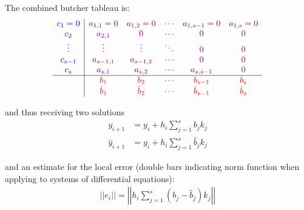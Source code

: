 The combined butcher tableau is:
\begin{align*}
    \begin{array}{c|ccccc}
    {\color{blue}c_1 = 0}
        & {\color{purple}a_{1,1} = 0}
        & {\color{purple}a_{1,2} = 0}
        & {\color{purple}\cdots}
        & {\color{purple}a_{1,{s-1}} = 0}
        & {\color{purple}a_{1,s} = 0}
        \\
        {\color{blue}c_2}
        & {\color{purple}a_{2,1}}
        & {\color{purple}0}
        & {\color{purple}\cdots}
        & {\color{purple}0}
        & {\color{purple}0}
        \\
        {\color{blue}\vdots}
        & {\color{purple}\vdots}
        & {\color{purple}\vdots}
        & {\color{purple}\ddots}
        & {\color{purple}0}
        & {\color{purple}0}
        \\
        {\color{blue}c_{s-1}}
        & {\color{purple}a_{s-1,1}}
        & {\color{purple}a_{s-1,2}}
        & {\color{purple}\cdots}
        & {\color{purple}0}
        & {\color{purple}0}
        \\
        {\color{blue}c_{s}}
        & {\color{purple}a_{s,1}}
        & {\color{purple}a_{s,2}}
        & {\color{purple}\cdots}
        & {\color{purple}a_{s,s-1}}
        & {\color{purple}0}
        \\
        \hline
        & {\color{red}b_1}
        & {\color{red}b_2}
        & {\color{red}\cdots}
        & {\color{red}b_{s-1}}
        & {\color{red}b_s}
        \\
        & {\color{red}\hat{b}_1}
        & {\color{red}\hat{b}_2}
        & {\color{red}\cdots}
        & {\color{red}\hat{b}_{s-1}}
        & {\color{red}\hat{b}_s}
    \end{array}
\end{align*}

and thus receiving two solutions
\begin{align*}
    y_{i+1} & = y_i + h_i\sum_{j=1}^{s}b_jk_j \\
    \hat{y}_{i+1} & = y_i + h_i\sum_{j=1}^{s}\hat{b}_jk_j
\end{align*}

and an estimate for the local error
(double bars indicating norm function when applying to systems of differential equations):
\begin{align*}
    ||e_i||
    = \left|\left|h_i\sum_{j=1}^{s}(b_j-\hat{b}_j)k_j\right|\right|
\end{align*}

